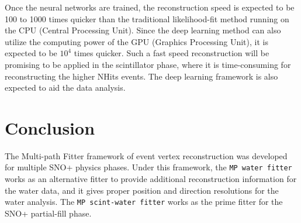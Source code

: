 Once the neural networks are trained, the reconstruction speed is expected to be 100 to 1000 times quicker than the traditional likelihood-fit method running on the CPU (Central Processing Unit). Since the deep learning method can also utilize the computing power of the GPU (Graphics Processing Unit), it is expected to be $10^4$ times quicker\cite{markNeuralTalk,markNeuralNetwork}. Such a fast speed reconstruction will be promising to be applied in the scintillator phase, where it is time-consuming for reconstructing the higher NHits events. The deep learning framework is also expected to aid the data analysis.

\section{Conclusion}
The Multi-path Fitter framework of event vertex reconstruction was developed for multiple SNO+ physics phases. Under this framework, the \texttt{MP water fitter} works as an alternative fitter to provide additional reconstruction information for the water data, and it gives proper position and direction resolutions for the water analysis. The \texttt{MP scint-water fitter} works as the prime fitter for the SNO+ partial-fill phase.